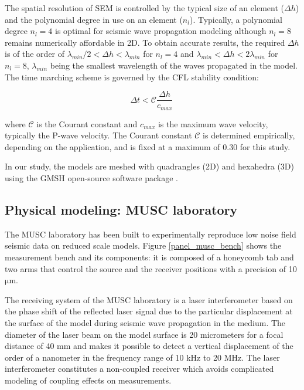 \documentclass[paper,extra]{gji} %
\begin{document}
\noindent The spatial resolution of SEM is controlled by the typical size of an element ($\Delta h$) and the polynomial degree in use on an element ($n_{l}$). Typically, a polynomial degree $n_{l}=4$ is optimal for seismic wave propagation modeling \citep{moczo2011finite} although $n_{l}=8$ remains numerically affordable in 2D. To obtain accurate results, the required $\Delta h$ is of the order of $\lambda_{min} /2 < \Delta h < \lambda_{min}$ for $n_{l}=4$ and $\lambda_{min} < \Delta h < 2\lambda_{min}$ for $n_{l}=8$, $\lambda_{min}$ being the smallest wavelength of the waves propagated in the model. The time marching scheme is governed by the CFL stability condition:

\begin{equation}
\Delta t < \mathcal{C}\frac{\Delta h}{c_{max}}\, 
\end{equation}

\noindent where $\mathcal{C}$ is the Courant constant and $c_{max}$ is the maximum wave velocity, typically the P-wave velocity. The Courant constant $\mathcal{C}$ is determined empirically, depending on the application, and is fixed at a maximum of 0.30 for this study.

\noindent In our study, the models are meshed with quadrangles (2D) and hexahedra (3D) using the GMSH open-source software package \citep{Geuzaine_MSH_2009}. 


\subsection{Physical modeling: MUSC laboratory}

\noindent The MUSC laboratory \citep{Bretaudeau_SSA_2008b,Bretaudeau_SSM_2011,Bretaudeau_FWI_2013} has been built to experimentally reproduce low noise field seismic data on reduced scale models. Figure \ref{panel_musc_bench} shows the measurement bench and its components: it is composed of a honeycomb tab and two arms that control the source and the receiver positions with a precision of 10 $\mathrm{\mu m}$.

\noindent The receiving system of the MUSC laboratory is a laser interferometer based on the phase shift of the reflected laser signal due to the particular displacement at the surface of the model during seismic wave propagation in the medium. The diameter of the laser beam on the model surface is 20 micrometers for a focal distance of 40 mm and makes it possible to detect a vertical displacement of the order of a nanometer in the frequency range of 10 kHz to 20 MHz. The laser interferometer constitutes a non-coupled receiver which avoids complicated modeling of coupling effects on measurements.
\end{document}
